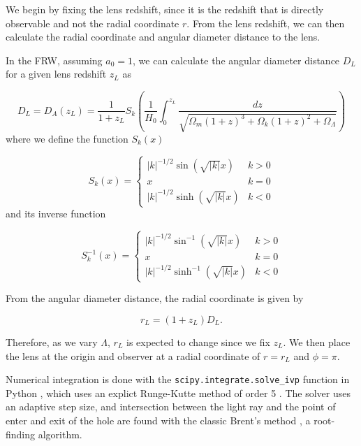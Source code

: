 We begin by fixing the lens redshift, since it is the redshift that is directly observable and not the radial coordinate $r$. From the lens redshift, we can then calculate the radial coordinate and angular diameter distance to the lens. 

In the FRW, assuming $a_0 = 1$, we can calculate the angular diameter distance $D_L$ for a given lens redshift $z_L$ as \citep{hogg1999distance}

\begin{equation}
  D_L = D_A(z_L) = \frac{1}{1+z_L} S_k\left ( \frac{1}{H_0}\int_0^{z_L} \frac{dz}{\sqrt{\Omega_m(1+z)^3 + \Omega_k (1+z)^2 + \Omega_{\Lambda}}}  \right )
  \label{eq:angular-diameter-distance-redshit-z}
\end{equation}
where we define the function $S_k(x)$

\begin{equation}
  S_k(x) = 
  \begin{cases}
    \mathopen| k \mathclose|^{-1/2} \sin(\sqrt{\mathopen| k \mathclose|}x) & k > 0\\
    x & k = 0\\
    \mathopen| k \mathclose|^{-1/2} \sinh(\sqrt{\mathopen| k \mathclose|}x) & k < 0
  \end{cases}
  \label{eq:sk}
\end{equation}
and its inverse function

\begin{equation}
  S_k^{-1}(x) = 
  \begin{cases}
    \mathopen| k \mathclose|^{-1/2} \sin^{-1}(\sqrt{\mathopen| k \mathclose|}x) & k > 0\\
    x & k = 0 \\
    \mathopen| k \mathclose|^{-1/2} \sinh^{-1}(\sqrt{\mathopen| k \mathclose|}x) & k < 0
  \end{cases}
  \label{eq:sk-inverse}
\end{equation}

From the angular diameter distance, the radial coordinate is given by 

\begin{equation}
  r_L = (1+z_L)D_L.
\end{equation}

Therefore, as we vary $\Lambda$, $r_L$ is expected to change since we fix $z_L$. We then place the lens at the origin and observer at a radial coordinate of $r = r_L$ and $\phi = \pi$. 

Numerical integration is done with the \texttt{scipy.integrate.solve\_ivp} function in Python \citep{jones2014scipy}, which uses an explict Runge-Kutte method of order 5 \citep{dormand1980family}. The solver uses an adaptive step size, and intersection between the light ray and the point of enter and exit of the hole are found with the classic Brent's method \citep{brent2013algorithms}, a root-finding algorithm. 

